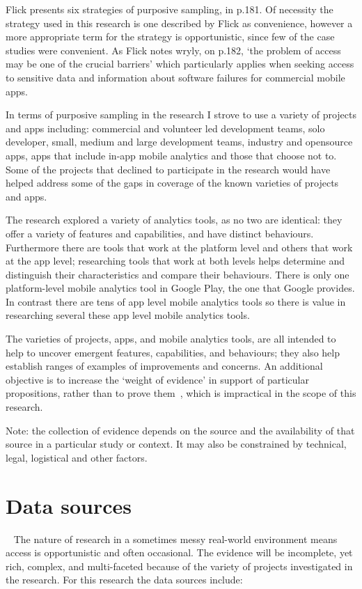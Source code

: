Flick presents six strategies of purposive sampling, in p.181. Of necessity the strategy used in this research is one described by Flick as convenience, however a more appropriate term for the strategy is opportunistic, since few of the case studies were convenient. As Flick notes wryly, on p.182, `the problem of access may be one of the crucial barriers' which particularly applies when seeking access to sensitive data and information about software failures for commercial mobile apps.

In terms of purposive sampling in the research I strove to use a variety of projects and apps including: commercial and volunteer led development teams, solo developer, small, medium and large development teams, industry and opensource apps, apps that include in-app mobile analytics and those that choose not to. Some of the projects that declined to participate in the research would have helped address some of the gaps in coverage of the known varieties of projects and apps.

The research explored a variety of analytics tools, as no two are identical: they offer a variety of features and capabilities, and have distinct behaviours.  Furthermore there are tools that work at the platform level and others that work at the app level; researching tools that work at both levels helps determine and distinguish their characteristics and compare their behaviours. There is only one platform-level mobile analytics tool in Google Play, the one that Google provides. In contrast there are tens of app level mobile analytics tools so there is value in researching several these app level mobile analytics tools.

The varieties of projects, apps, and mobile analytics tools, are all intended to help to uncover emergent features, capabilities, and behaviours; they also help establish ranges of examples of improvements and concerns. An additional objective is to increase the `weight of evidence' in support of particular propositions, rather than to prove them~\citep[see p.569]{seaman1999_qualitative_methods_in_esse}, which is impractical in the scope of this research.

Note: the collection of evidence depends on the source and the availability of that source in a particular study or context. It may also be constrained by technical, legal, logistical and other factors.

\section{Data sources}~\label{methodology-data-sources}
The nature of research in a sometimes messy real-world environment means access is opportunistic and often occasional. The evidence will be incomplete, yet rich, complex, and multi-faceted because of the variety of projects investigated in the research. For this research the data sources include:


